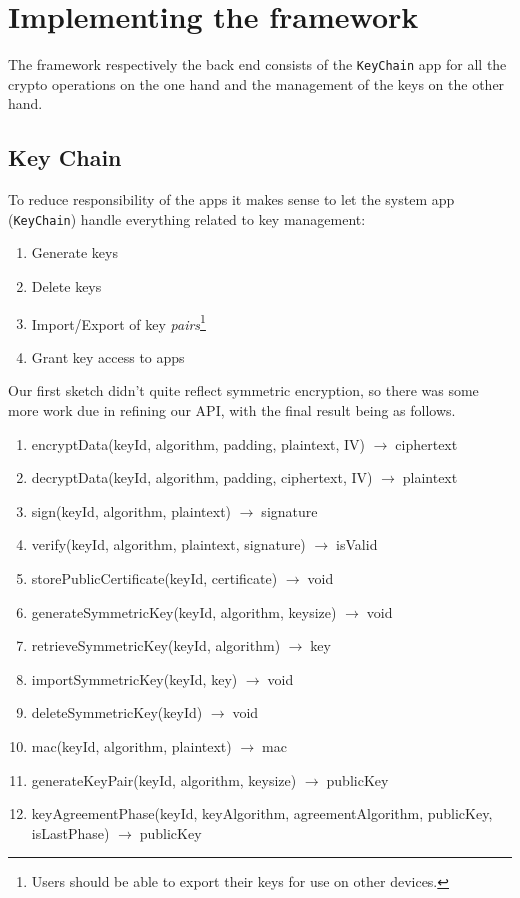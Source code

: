 \documentclass[a4paper,draft]{scrartcl}
\newcommand{\totype}{\(\to\;\)}
\begin{document}
\section{Implementing the framework}

	The framework respectively the back end consists of the \texttt{KeyChain} app for all the crypto operations on the one hand and the management of the keys on the other hand.

	\subsection{Key Chain}
		To reduce responsibility of the apps it makes sense to let the system app (\texttt{KeyChain}) handle everything related to key management:
		\begin{enumerate}
			\item Generate keys
			\item Delete keys
			\item Import/Export of key \emph{pairs}\footnote{Users should be able to export their keys for use on other devices.}
			\item Grant key access to apps
		\end{enumerate}
		Our first sketch didn't quite reflect symmetric encryption, so there was some more work due in refining our API, with the final result being as follows.

		\begin{enumerate}
		\tt
			\item encryptData(keyId, algorithm, padding, plaintext, IV) \totype ciphertext
			\item decryptData(keyId, algorithm, padding, ciphertext, IV) \totype plaintext
			\item sign(keyId, algorithm, plaintext) \totype signature
			\item verify(keyId, algorithm, plaintext, signature) \totype isValid
			\item storePublicCertificate(keyId, certificate) \totype void

			\item generateSymmetricKey(keyId, algorithm, keysize) \totype void
			\item retrieveSymmetricKey(keyId, algorithm) \totype key
			\item importSymmetricKey(keyId, key) \totype void
			\item deleteSymmetricKey(keyId) \totype void
			\item mac(keyId, algorithm, plaintext) \totype mac

			\item generateKeyPair(keyId, algorithm, keysize) \totype publicKey
			\item keyAgreementPhase(keyId, keyAlgorithm, agreementAlgorithm,
				\linebreak %
				publicKey, isLastPhase) \totype publicKey
		\end{enumerate}
\end{document}
